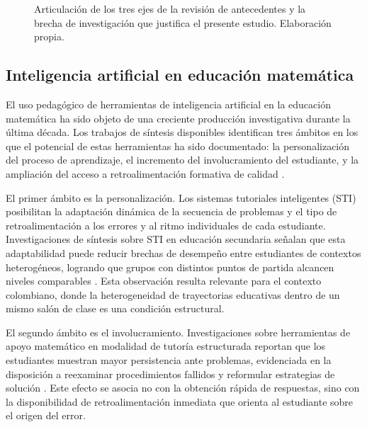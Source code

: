 \begin{figure}[H]
\caption{Articulación de los tres ejes de la revisión de antecedentes y la brecha de investigación
que justifica el presente estudio. Elaboración propia.}
\label{fig:mapa_antecedentes}
\end{figure}

\subsection{Inteligencia artificial en educación matemática}

El uso pedagógico de herramientas de inteligencia artificial en la educación matemática ha sido objeto de una creciente producción investigativa durante la última década. Los trabajos de síntesis disponibles identifican tres ámbitos en los que el potencial de estas herramientas ha sido documentado: la personalización del proceso de aprendizaje, el incremento del involucramiento del estudiante, y la ampliación del acceso a retroalimentación formativa de calidad \parencite{yildizTrendsInsightsAI2025}.

El primer ámbito es la personalización. Los sistemas tutoriales inteligentes (STI) posibilitan la adaptación dinámica de la secuencia de problemas y el tipo de retroalimentación a los errores y al ritmo individuales de cada estudiante. Investigaciones de síntesis sobre STI en educación secundaria señalan que esta adaptabilidad puede reducir brechas de desempeño entre estudiantes de contextos heterogéneos, logrando que grupos con distintos puntos de partida alcancen niveles comparables \parencite{vanlehnRelativeEffectivenessHuman2011}. Esta observación resulta relevante para el contexto colombiano, donde la heterogeneidad de trayectorias educativas dentro de un mismo salón de clase es una condición estructural.

El segundo ámbito es el involucramiento. Investigaciones sobre herramientas de apoyo matemático en modalidad de tutoría estructurada reportan que los estudiantes muestran mayor persistencia ante problemas, evidenciada en la disposición a reexaminar procedimientos fallidos y reformular estrategias de solución \parencite{cromptonArtificialIntelligenceK122022}. Este efecto se asocia no con la obtención rápida de respuestas, sino con la disponibilidad de retroalimentación inmediata que orienta al estudiante sobre el origen del error.

